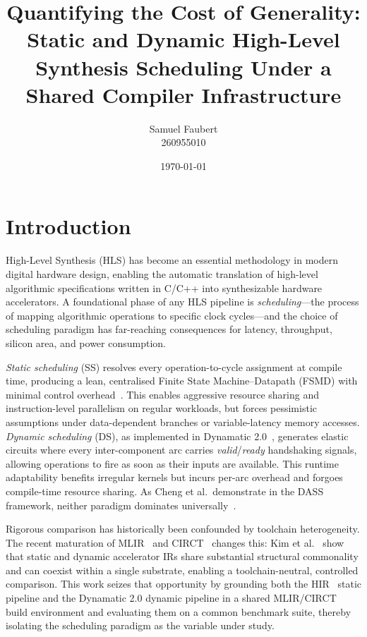 \documentclass[sigplan,10pt,review,nonacm]{acmart}
\title{Quantifying the Cost of Generality: Static and Dynamic High-Level Synthesis Scheduling Under a Shared Compiler Infrastructure}
\author{Samuel Faubert \\ 260955010}
\date{\today}
\begin{document}
\maketitle
\thispagestyle{fancy}

\section{Introduction}

High-Level Synthesis (HLS) has become an essential methodology in
modern digital hardware design, enabling the automatic translation of
high-level algorithmic specifications written in C/C++ into synthesizable
hardware accelerators. A foundational phase of any HLS pipeline is
\emph{scheduling}---the process of mapping algorithmic operations to
specific clock cycles---and the choice of scheduling paradigm has
far-reaching consequences for latency, throughput, silicon area, and
power consumption.

\emph{Static scheduling} (SS) resolves every operation-to-cycle
assignment at compile time, producing a lean, centralised Finite State
Machine--Datapath (FSMD) with minimal control overhead~\cite{9378784}.
This enables aggressive resource sharing and instruction-level
parallelism on regular workloads, but forces pessimistic assumptions
under data-dependent branches or variable-latency memory accesses.
\emph{Dynamic scheduling} (DS), as implemented in
Dynamatic 2.0~\cite{10.1145/3373087.3375391}, generates elastic circuits
where every inter-component arc carries \textit{valid}/\textit{ready}
handshaking signals, allowing operations to fire as soon as their inputs
are available. This runtime adaptability benefits irregular kernels but
incurs per-arc overhead and forgoes compile-time resource sharing.
As Cheng et al.\ demonstrate in the DASS framework, neither paradigm
dominates universally~\cite{9378784}.

Rigorous comparison has historically been confounded by toolchain
heterogeneity. The recent maturation of MLIR~\cite{lattner2021mlir}
and CIRCT~\cite{circt} changes this: Kim et al.~\cite{10.1145/3689790}
show that static and dynamic accelerator IRs share substantial
structural commonality and can coexist within a single substrate,
enabling a toolchain-neutral, controlled comparison. This work seizes
that opportunity by grounding both the HIR~\cite{10.1145/3623278.3624767}
static pipeline and the Dynamatic 2.0 dynamic pipeline in a shared
MLIR/CIRCT build environment and evaluating them on a common benchmark
suite, thereby isolating the scheduling paradigm as the variable under
study.
\end{document}
